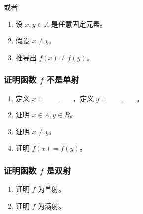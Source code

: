 或者\\

\begin{enumerate}
    \item 设 $x,y \in A$ 是任意固定元素。
    \item 假设 $x \ne y$。
    \item 推导出 $f(x) \ne f(y)$。
\end{enumerate}

\subsubsection*{证明函数 $f$ 不是单射}

\begin{enumerate}
    \item 定义 $x = \underline{\qquad\qquad}$，定义 $y = \underline{\qquad\qquad}$。
    \item 证明 $x \in A, y \in B$。
    \item 证明 $x \ne y$。
    \item 证明 $f(x) = f(y)$。
\end{enumerate}

\subsubsection*{证明函数 $f$ 是双射}

\begin{enumerate}
    \item 证明 $f$ 为单射。
    \item 证明 $f$ 为满射。
\end{enumerate}